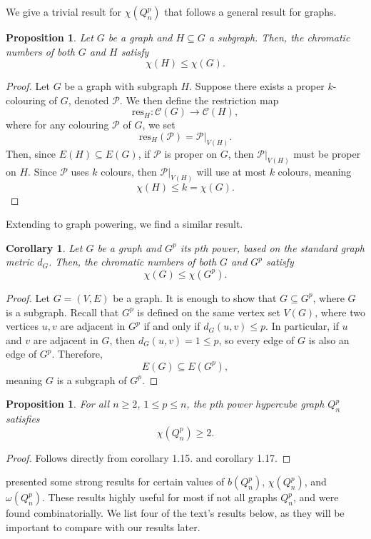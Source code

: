 \documentclass[12pt]{amsart}
\numberwithin{figure}{section}
\theoremstyle{plain}
\newtheorem{proposition}[theorem]{Proposition}
\newtheorem{corollary}[theorem]{Corollary}
\begin{document}
\indent We give a trivial result for $\chi(Q_{n}^{p})$ that follows a general result for graphs.
\begin{proposition}
    Let $G$ be a graph and $H\subseteq G$ a subgraph. Then, the chromatic numbers of both $G$ and $H$ satisfy
    \[\chi(H) \leq \chi(G).\]
\end{proposition}
\begin{proof}
    Let $G$ be a graph with subgraph $H$. Suppose there exists a proper $k$-colouring of $G$, denoted $\mathcal{P}$. We then define the restriction map
    \[\mathrm{res}_{H}:\mathscr{C}(G) \to\mathscr{C}(H),\]
    where for any colouring $\mathcal{P}$ of $G$, we set
    \[\mathrm{res}_{H}(\mathcal{P}) = \mathcal{P}|_{V(H)}.\]
    Then, since $E(H) \subseteq E(G)$, if $\mathcal{P}$ is proper on $G$, then $\mathcal{P}|_{V(H)}$ must be proper on $H$. Since $\mathcal{P}$ uses $k$ colours, then $\mathcal{P}|_{V(H)}$ will use at most $k$ colours, meaning
    \[\chi(H) \leq k = \chi(G).\]
\end{proof}
\indent Extending to graph powering, we find a similar result.
\begin{corollary}
    Let $G$ be a graph and $G^{p}$ its $p$th power, based on the standard graph metric $d_{G}$. Then, the chromatic numbers of both $G$ and $G^{p}$ satisfy
    \[\chi(G) \leq \chi(G^{p}).\]
\end{corollary}
\begin{proof} Let $G = (V,E)$ be a graph. It is enough to show that $G\subseteq G^{p}$, where $G$ is a subgraph. Recall that $G^{p}$ is defined on the same vertex set $V(G)$, where two vertices $u,v$ are adjacent in $G^{p}$ if and only if $d_{G}(u,v) \leq p$. In particular, if $u$ and $v$ are adjacent in $G$, then $d_{G}(u,v) = 1 \leq p$, so every edge of $G$ is also an edge of $G^{p}$. Therefore, 
\[E(G) \subseteq E(G^{p}),\] 
meaning $G$ is a subgraph of $G^{p}$.
\end{proof}
\begin{proposition}
    For all $n\geq 2$, $1\leq p\leq n$, the $p$th power hypercube graph $Q_{n}^{p}$ satisfies
    \[\chi(Q_{n}^{p}) \geq 2.\]
\end{proposition}
\begin{proof}
    Follows directly from corollary 1.15. and corollary 1.17.
\end{proof}
\indent \cite{Francis17} presented some strong results for certain values of $b(Q_{n}^{p})$, $\chi(Q_{n}^{p})$, and $\omega(Q_{n}^{p})$. These results highly useful for most if not all graphs $Q_{n}^{p}$, and were found combinatorially. We list four of the text's results below, as they will be important to compare with our results later.
\end{document}
